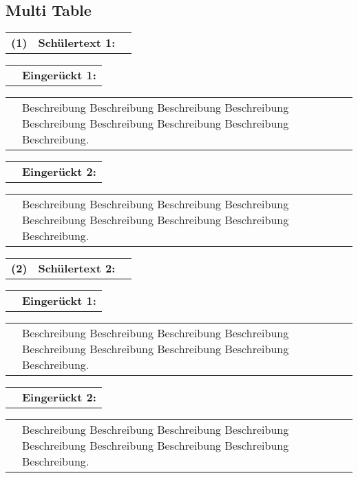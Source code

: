 \documentclass[a4paper, 12pt, xcolor=dvipsnames]{scrartcl}	%
\begin{document}
\subsection{Multi Table}
\vspace{0.5cm}
\begin{longtable}[h!]{p{0.5cm}p{5.2cm}p{9.8cm}}
	\large\textbf{(1)}& \textcolor{red!100} {\large\textbf{Schülertext 1:}}&
\end{longtable}
\vspace{-0.5cm}
\begin{longtable}[h!]{p{1.0cm}p{14.5cm}}
	&\textcolor{red!100} {\textbf{Eingerückt 1:}}
\end{longtable}
\vspace{-0.5cm}
\begin{longtable}[h!]{p{2.0cm}p{13.5cm}}
	&Beschreibung Beschreibung Beschreibung Beschreibung Beschreibung Beschreibung Beschreibung Beschreibung Beschreibung. 
\end{longtable}
\vspace{-0.5cm}
\begin{longtable}[h!]{p{1.0cm}p{14.5cm}}
	&\textcolor{red!100} {\textbf{Eingerückt 2:}}
\end{longtable}
\vspace{-0.5cm}
\begin{longtable}[h!]{p{2.0cm}p{13.5cm}}
	&Beschreibung Beschreibung Beschreibung Beschreibung Beschreibung Beschreibung Beschreibung Beschreibung Beschreibung.
\end{longtable}
\vspace{0.5cm}
\begin{longtable}[h!]{p{0.5cm}p{5.2cm}p{9.8cm}}
	\large\textbf{(2)}& \textcolor{red!100} {\large\textbf{Schülertext 2:}}&
\end{longtable}
\vspace{-0.5cm}
\begin{longtable}[h!]{p{1.0cm}p{14.5cm}}
	&\textcolor{red!100} {\textbf{Eingerückt 1:}}
\end{longtable}
\vspace{-0.5cm}
\begin{longtable}[h!]{p{2.0cm}p{13.5cm}}
	&Beschreibung Beschreibung Beschreibung Beschreibung Beschreibung Beschreibung Beschreibung Beschreibung Beschreibung. 
\end{longtable}
\vspace{-0.5cm}
\begin{longtable}[h!]{p{1.0cm}p{14.5cm}}
	&\textcolor{red!100} {\textbf{Eingerückt 2:}}
\end{longtable}
\vspace{-0.5cm}
\begin{longtable}[h!]{p{2.0cm}p{13.5cm}}
	&Beschreibung Beschreibung Beschreibung Beschreibung Beschreibung Beschreibung Beschreibung Beschreibung Beschreibung.
\end{longtable}
\end{document}
